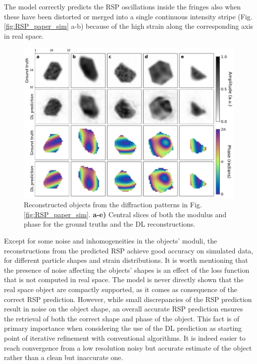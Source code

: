 The model correctly predicts the RSP oscillations inside the fringes also when these have been distorted or merged into
a single continuous intensity stripe (Fig. \ref{fig:RSP_paper_sim} a-b) because of the high strain along the corresponding 
axis in real space.

\begin{figure}[H]
    \centering
    \includegraphics[width=\textwidth]{figures/Phasing/obj_3Dsim.pdf}
    \caption{Reconstructed objects from the diffraction patterns in Fig. \ref{fig:RSP_paper_sim}.  
    \textbf{a-e)} Central slices of both the modulus and phase for the ground truths and the DL reconstructions.}
    \label{fig:obj_paper_sim}
\end{figure}

Except for some noise and inhomogeneities in the objects' moduli, the reconstructions from the predicted RSP achieve 
good accuracy on simulated data, for different particle shapes and strain distributions. It is worth mentioning that 
the presence of noise affecting the objects' shapes is an effect of the loss function that is not computed in real space. 
The model is never directly shown that the real space object are compactly supported, as it comes as consequence of the  
correct RSP prediction. However, while small discrepancies of the RSP prediction result in noise on the object shape, 
an overall accurate RSP prediction ensures the retrieval of both the correct shape and phase of the object. This fact is 
of primary importance when considering the use of the DL prediction as starting point of iterative refinement with 
conventional algorithms. It is indeed easier to reach convergence from a low resolution noisy but accurate estimate of 
the object rather than a clean but inaccurate one.  


